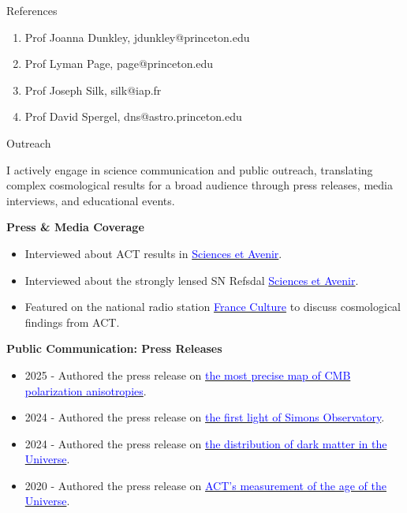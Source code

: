 \documentclass{resume} %
\newcommand{\TIB}[1]{\textcolor{blue}{#1}}
\begin{document}
\begin{rSection}{References }

\begin{enumerate}
\item Prof Joanna Dunkley, jdunkley@princeton.edu
\item Prof Lyman Page, page@princeton.edu
\item Prof Joseph Silk, silk@iap.fr
\item Prof David Spergel, dns@astro.princeton.edu
\end{enumerate}

\end{rSection}

\newpage



\begin{rSection}{Outreach}

I actively engage in science communication and public outreach, translating complex cosmological results for a broad audience through press releases, media interviews, and educational events.

\textbf{Press \& Media Coverage}
\begin{itemize}
  \item Interviewed about ACT results in \href{https://www.sciencesetavenir.fr/espace/univers/une-nouvelle-mesure-de-la-constante-de-hubble-confirme-celle-du-satellite-planck_150719}{\TIB{Sciences et Avenir}}.
   \item Interviewed about the strongly lensed SN Refsdal \href{https://www.sciencesetavenir.fr/espace/astrophysique/le-mystere-persistant-du-taux-d-expansion-de-l-univers_171338}{\TIB{Sciences et Avenir}}.
  \item Featured on the national radio station \href{https://media.radiofrance-podcast.net/2021/2/2/NET_MFC_ee6d807d-2c74-49cd-9f1e-7c7d66957f58.mp3}{\TIB{France Culture}} to discuss cosmological findings from ACT.
\end{itemize}

\textbf{Public Communication: Press Releases}
\begin{itemize}
  \item 2025 - Authored the press release on \href{https://www.in2p3.cnrs.fr/fr/cnrsinfo/mesure-de-la-polarisation-du-fond-diffus-cosmologique-par-la-collaboration-act-une-fenetre/}{\TIB{the most precise map of CMB polarization anisotropies}}.
  \item 2024 - Authored the press release on \href{https://www.in2p3.cnrs.fr/en/cnrsinfo/search-echo-big-bang-simons-observatory}{\TIB{the first light of Simons Observatory}}.
  \item 2024 - Authored the press release on \href{https://www.in2p3.cnrs.fr/fr/cnrsinfo/la-collaboration-act-devoile-une-nouvelle-carte-de-la-distribution-de-la-matiere-noire}{\TIB{the distribution of dark matter in the Universe}}.
  \item 2020 - Authored the press release on \href{https://www.ijclab.in2p3.fr/actualite/act-leve-le-voile-sur-lage-de-lunivers/}{\TIB{ACT's measurement of the age of the Universe}}.
\end{itemize}


\end{rSection}
\end{document}

